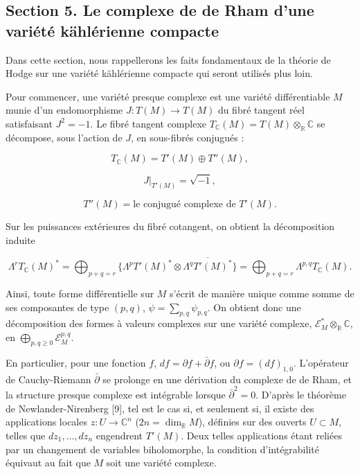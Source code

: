 \documentclass[
  french,
  a3paper,
  a3paper]{extarticle}
\begin{document}
\subsection{Section 5. Le complexe de de Rham d'une variété kählérienne
compacte}\label{section-5.-le-complexe-de-de-rham-dune-variuxe9tuxe9-kuxe4hluxe9rienne-compacte}

Dans cette section, nous rappellerons les faits fondamentaux de la
théorie de Hodge sur une variété kählérienne compacte qui seront
utilisés plus loin.

Pour commencer, une variété presque complexe est une variété
différentiable \(M\) munie d'un endomorphisme
\(J:T(M)\longrightarrow T(M)\) du fibré tangent réel satisfaisant
\(J^2=-1\). Le fibré tangent complexe
\(T_{\mathbb C}(M)=T(M)\otimes_{\mathbb R}\mathbb C\) se décompose, sous
l'action de \(J\), en sous-fibrés conjugués :

\[T_{\mathbb C}(M)=T'(M)\oplus T''(M),\]

\[J|_{T'(M)}=\sqrt{-1},\]

\[T''(M)=\text{le conjugué complexe de }T'(M).\]

Sur les puissances extérieures du fibré cotangent, on obtient la
décomposition induite

\[\Lambda^rT_{\mathbb C}(M)^*=\bigoplus_{p+q=r}\{\Lambda^pT'(M)^*\otimes\overline{\Lambda^qT'(M)^*}\}=\bigoplus_{p+q=r}\Lambda^{p,q}T_{\mathbb C}(M).\]

Ainsi, toute forme différentielle sur \(M\) s'écrit de manière unique
comme somme de ses composantes de type \((p,q)\),
\(\psi=\sum_{p,q}\psi_{p,q}\). On obtient donc une décomposition des
formes à valeurs complexes sur une variété complexe,
\(\mathcal E_M^*\otimes_{\mathbb R}\mathbb C\), en
\(\bigoplus_{p,q\ge0}\mathcal E_M^{p,q}\).

En particulier, pour une fonction \(f\),
\(df=\partial f+\bar\partial f\), ou \(\partial f=(df)_{1,0}\).
L'opérateur de Cauchy-Riemann \(\bar\partial\) se prolonge en une
dérivation du complexe de de Rham, et la structure presque complexe est
intégrable lorsque \(\bar\partial^2=0\). D'après le théorème de
Newlander-Nirenberg {[}9{]}, tel est le cas si, et seulement si, il
existe des applications locales \(z:U\longrightarrow\mathbb C^n\)
(\(2n=\dim_{\mathbb R}M\)), définies sur des ouverts \(U\subset M\),
telles que \(dz_1,\ldots,dz_n\) engendrent \(T'(M)\). Deux telles
applications étant reliées par un changement de variables biholomorphe,
la condition d'intégrabilité équivaut au fait que \(M\) soit une variété
complexe.
\end{document}
